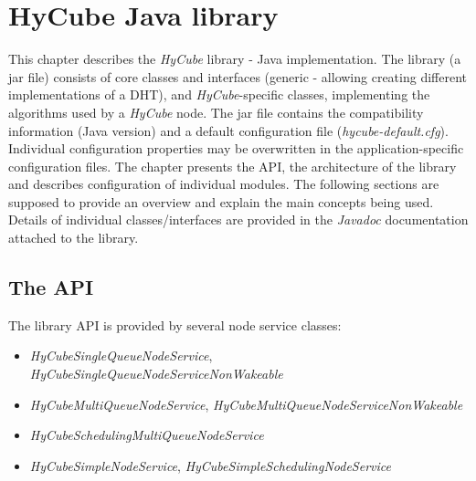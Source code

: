
\chapter{HyCube Java library}
\label{sec:library}

This chapter describes the \emph{HyCube} library - Java implementation. The library (a jar file) consists of core classes and interfaces (generic - allowing creating different implementations of a DHT), and \emph{HyCube}-specific classes, implementing the algorithms used by a \emph{HyCube} node. The jar file contains the compatibility information (Java version) and a default configuration file (\emph{hycube-default.cfg}). Individual configuration properties may be overwritten in the application-specific configuration files. The chapter presents the API, the architecture of the library and describes configuration of individual modules. The following sections are supposed to provide an overview and explain the main concepts being used. Details of individual classes/interfaces are provided in the \emph{Javadoc} documentation attached to the library.




\section{The API}

The library API is provided by several node service classes:

\begin{itemize}
	\renewcommand{\labelitemi}{$\bullet$}
	
	\item \emph{HyCubeSingleQueueNodeService}, \emph{HyCubeSingleQueueNodeServiceNonWakeable}
	\item \emph{HyCubeMultiQueueNodeService}, \emph{HyCubeMultiQueueNodeServiceNonWakeable}
	\item \emph{HyCubeSchedulingMultiQueueNodeService}
	\item \emph{HyCubeSimpleNodeService}, \emph{HyCubeSimpleSchedulingNodeService}
	
	
\end{itemize}

